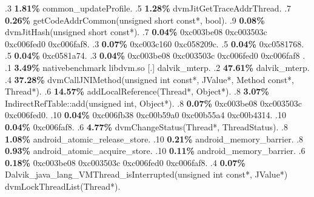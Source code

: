 \begin{profile}
{.3 \textbf{1.81\%} common\_updateProfile. 
.5 \textbf{1.28\%} dvmJitGetTraceAddrThread. 
.7 \textbf{0.26\%} getCodeAddrCommon(unsigned short const*, bool). 
.9 \textbf{0.08\%} dvmJitHash(unsigned short const*). 
.7 \textbf{0.04\%} 0xc003be08\newline {} 0xc003503c\newline {} 0xc006fed0\newline {} 0xc006faf8. 
.3 \textbf{0.07\%} 0xc003c160\newline {} 0xc058209c. 
.5 \textbf{0.04\%} 0xc0581768. 
.5 \textbf{0.04\%} 0xc0581a74. 
.3 \textbf{0.04\%} 0xc003be08\newline {} 0xc003503c\newline {} 0xc006fed0\newline {} 0xc006faf8\newline {} . 
.1 \textbf{ 3.49\%} nativebenchmark  libdvm.so              [.] dalvik\_mterp. 
.2 \textbf{47.61\%} dalvik\_mterp. 
.4 \textbf{37.28\%} dvmCallJNIMethod(unsigned int const*, JValue*, Method const*, Thread*). 
.6 \textbf{14.57\%} addLocalReference(Thread*, Object*). 
.8 \textbf{3.07\%} IndirectRefTable::add(unsigned int, Object*). 
.8 \textbf{0.07\%} 0xc003be08\newline {} 0xc003503c\newline {} 0xc006fed0. 
.10 \textbf{0.04\%} 0xc006fb38\newline {} 0xc00b59a0\newline {} 0xc00b55a4\newline {} 0xc00b4314. 
.10 \textbf{0.04\%} 0xc006faf8. 
.6 \textbf{4.77\%} dvmChangeStatus(Thread*, ThreadStatus). 
.8 \textbf{1.08\%} android\_atomic\_release\_store. 
.10 \textbf{0.21\%} android\_memory\_barrier. 
.8 \textbf{0.93\%} android\_atomic\_acquire\_store. 
.10 \textbf{0.11\%} android\_memory\_barrier. 
.6 \textbf{0.18\%} 0xc003be08\newline {} 0xc003503c\newline {} 0xc006fed0\newline {} 0xc006faf8. 
.4 \textbf{0.07\%} Dalvik\_java\_lang\_VMThread\_isInterrupted(unsigned int const*, JValue*)\newline {} dvmLockThreadList(Thread*). 
}
\end{profile}

